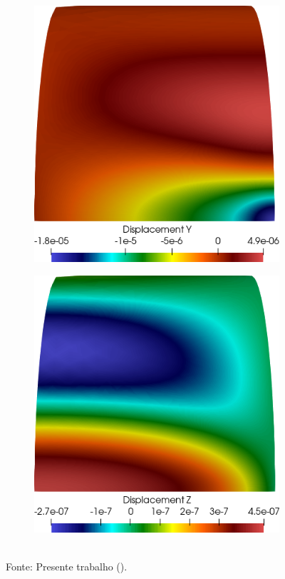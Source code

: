 \begin{figure}[h!]
\begin{subfigure}{0.3\textwidth}
    \end{subfigure}
    \begin{subfigure}{0.3\textwidth}
        \includegraphics[width=\linewidth]{Figuras/cylinder-shell/uy.png}
    \end{subfigure}
    \begin{subfigure}{0.3\textwidth}
        \includegraphics[width=\linewidth]{Figuras/cylinder-shell/uz.png}
    \end{subfigure}
    \\Fonte: Presente trabalho (\the\year).
    \label{fig:cylinder-shell-disp}
\end{figure}

